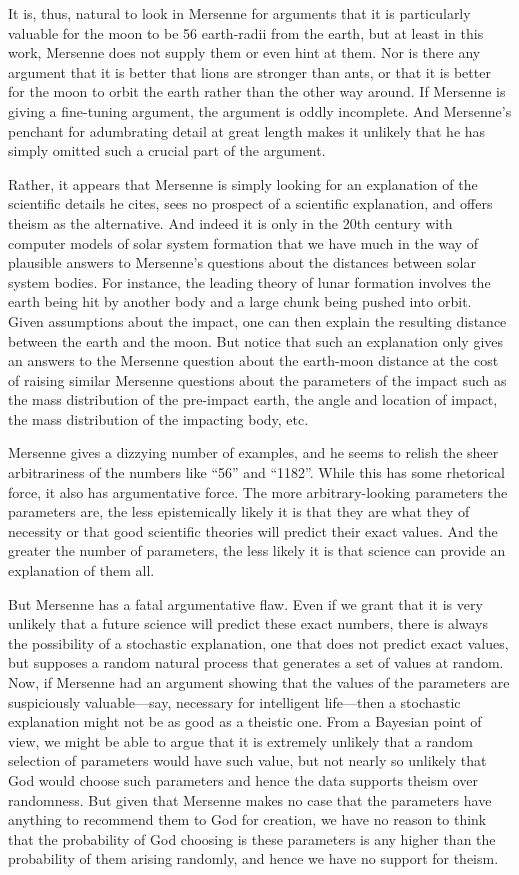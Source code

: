 It is, thus, natural to look in Mersenne for arguments that it is particularly valuable for the moon to be 56 earth-radii
from the earth, but at least in this work, Mersenne does not supply them or even hint at them. Nor is there any argument
that it is better that lions are stronger than ants, or that it is better for the moon to orbit the earth rather than
the other way around. If Mersenne is giving a fine-tuning argument, the argument is oddly incomplete. And Mersenne's
penchant for adumbrating detail at great length makes it unlikely that he has simply omitted such a crucial part of the
argument.

Rather, it appears that Mersenne is simply looking for an explanation of the scientific details he cites, sees no
prospect of a scientific explanation, and offers theism as the alternative. And indeed it is only in the 20th century
with computer models of solar system formation that we have much in the way of plausible answers to Mersenne's questions
about the distances between solar system bodies. For instance, the leading theory of lunar formation involves the earth being hit by
another body and a large chunk being pushed into orbit. Given assumptions about the impact, one can then explain the
resulting distance between the earth and the moon. But notice that such an explanation only gives an answers to the 
Mersenne question about the earth-moon distance at the cost of raising similar Mersenne questions about the 
parameters of the impact such as the mass distribution of the pre-impact earth, the angle and location of impact, the 
mass distribution of the impacting body, etc.

Mersenne gives a dizzying number of examples, and he seems to relish the sheer arbitrariness of the numbers like ``56''
and ``1182''. While this has some rhetorical force, it also has argumentative force. The more arbitrary-looking parameters
the parameters are, the less epistemically likely it is that they are what they of necessity or that good scientific theories
will predict their exact values. And the greater the number
of parameters, the less likely it is that science can provide an explanation of them all.

But Mersenne has a fatal argumentative flaw. Even if we grant that it is very unlikely that a future science will predict
these exact numbers, there is always the possibility of a stochastic explanation, one that does not predict exact values, 
but supposes a random natural process that generates a set of values at random. Now, if Mersenne had an argument showing
that the values of the parameters are suspiciously valuable---say, necessary for intelligent life---then a stochastic
explanation might not be as good as a theistic one. From a Bayesian point of view, we might be able to argue that it is
extremely unlikely that a random selection of parameters would have such value, but not nearly so unlikely that God would
choose such parameters and hence the data supports theism over randomness. But given that Mersenne makes no case that 
the parameters have anything to recommend them to God for creation, we have no reason to think that the probability of God 
choosing is these parameters is any higher than the probability of them arising randomly, and hence we have no support for
theism.

